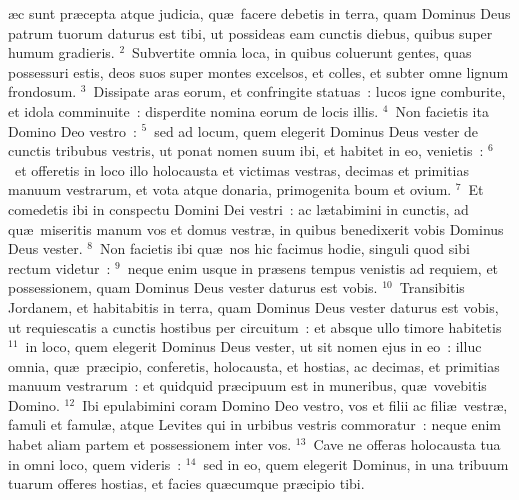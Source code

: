 \bchapter
{}\ae c sunt pr\ae cepta atque judicia, qu\ae\ facere debetis in terra, quam Dominus Deus patrum tuorum daturus est tibi, ut possideas eam cunctis diebus, quibus super humum gradieris.
${}^{2}$~Subvertite omnia loca, in quibus coluerunt gentes, quas possessuri estis, deos suos super montes excelsos, et colles, et subter omne lignum frondosum.
${}^{3}$~Dissipate aras eorum, et confringite statuas~: lucos igne comburite, et idola comminuite~: disperdite nomina eorum de locis illis.
${}^{4}$~Non facietis ita Domino Deo vestro~:
${}^{5}$~sed ad locum, quem elegerit Dominus Deus vester de cunctis tribubus vestris, ut ponat nomen suum ibi, et habitet in eo, venietis~:
${}^{6}$~et offeretis in loco illo holocausta et victimas vestras, decimas et primitias manuum vestrarum, et vota atque donaria, primogenita boum et ovium.
${}^{7}$~Et comedetis ibi in conspectu Domini Dei vestri~: ac l\ae tabimini in cunctis, ad qu\ae\ miseritis manum vos et domus vestr\ae , in quibus benedixerit vobis Dominus Deus vester.
${}^{8}$~Non facietis ibi qu\ae\ nos hic facimus hodie, singuli quod sibi rectum videtur~:
${}^{9}$~neque enim usque in pr\ae sens tempus venistis ad requiem, et possessionem, quam Dominus Deus vester daturus est vobis.
${}^{10}$~Transibitis Jordanem, et habitabitis in terra, quam Dominus Deus vester daturus est vobis, ut requiescatis a cunctis hostibus per circuitum~: et absque ullo timore habitetis
${}^{11}$~in loco, quem elegerit Dominus Deus vester, ut sit nomen ejus in eo~: illuc omnia, qu\ae\ pr\ae cipio, conferetis, holocausta, et hostias, ac decimas, et primitias manuum vestrarum~: et quidquid pr\ae cipuum est in muneribus, qu\ae\ vovebitis Domino.
${}^{12}$~Ibi epulabimini coram Domino Deo vestro, vos et filii ac fili\ae\ vestr\ae , famuli et famul\ae , atque Levites qui in urbibus vestris commoratur~: neque enim habet aliam partem et possessionem inter vos.
${}^{13}$~Cave ne offeras holocausta tua in omni loco, quem videris~:
${}^{14}$~sed in eo, quem elegerit Dominus, in una tribuum tuarum offeres hostias, et facies qu\ae cumque pr\ae cipio tibi.


